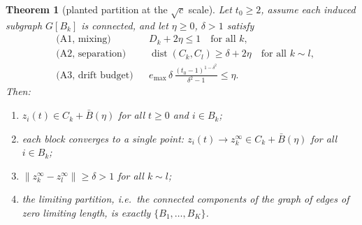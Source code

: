 \documentclass[11pt]{article}
\newtheorem{theorem}{Theorem}[section]
\theoremstyle{definition}
\theoremstyle{remark}
\newcommand{\dist}{\operatorname{dist}}
\begin{document}
\begin{theorem}[planted partition at the $\sqrt c$ scale]\label{thm:A}
Let $t_0\ge2$, assume each induced subgraph $G[B_k]$ is connected, and let $\eta\ge0$, $\delta>1$ satisfy
\begin{align}
&\text{(A1, mixing)} && D_k+2\eta\le1\quad\text{for all }k, \label{A1}\\
&\text{(A2, separation)} && \dist(C_k,C_l)\ge\delta+2\eta\quad\text{for all }k\sim l, \label{A2}\\
&\text{(A3, drift budget)} && e_{\max}\,\delta\,\frac{(t_0-1)^{1-\delta^2}}{\delta^2-1}\le\eta. \label{A3}
\end{align}
Then:
\begin{enumerate}[label=(\alph*)]
\item $z_i(t)\in C_k+\bar B(\eta)$ for all $t\ge0$ and $i\in B_k$;
\item each block converges to a single point: $z_i(t)\to z_k^\infty\in C_k+\bar B(\eta)$ for all $i\in B_k$;
\item $\|z_k^\infty-z_l^\infty\|\ge\delta>1$ for all $k\sim l$;
\item the limiting partition, i.e.\ the connected components of the graph of edges of zero limiting
length, is exactly $\{B_1,\dots,B_K\}$.
\end{enumerate}
\end{theorem}
\end{document}
